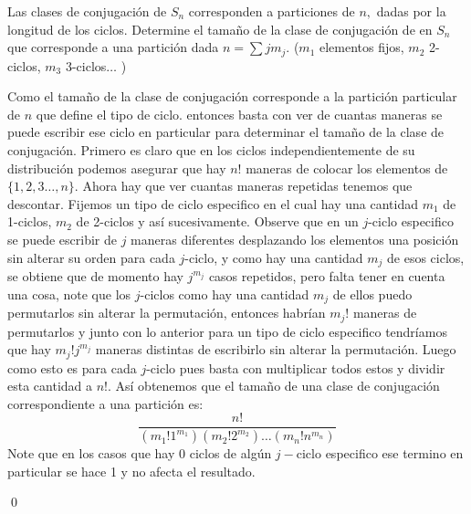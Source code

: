 
\usepackage{amsmath}
\usepackage{geometry}
\usepackage{tikz}
\usepackage{float}
\usepackage{graphics}



\maketitle
\thispagestyle{empty}
\newpage 

\begin{homeworkProblem}
    Las clases de conjugación de $S_n$ corresponden a particiones de $n,$ dadas por la longitud de los ciclos. Determine el tamaño de la clase de conjugación de en $S_n$ que corresponde a una partición dada $n=\sum jm_j.$ ($m_1$ elementos fijos, $m_2$ 2-ciclos, $m_3$ 3-ciclos$\dots$ )
    \begin{solucion}
     Como el tamaño de la clase de conjugación corresponde a la partición particular de $n$ que define el tipo de ciclo. entonces basta con ver de cuantas maneras se puede escribir ese ciclo en particular para determinar el tamaño de la clase de conjugación. Primero es claro que en los ciclos independientemente de su distribución podemos asegurar que hay $n!$ maneras de colocar los elementos de $\{1,2,3\dots,n\}$. Ahora hay que ver cuantas maneras repetidas tenemos que descontar. Fijemos un tipo de ciclo especifico en el cual hay una cantidad $m_1$ de 1-ciclos, $m_2$ de 2-ciclos y así sucesivamente. Observe que en un $j$-ciclo especifico se puede escribir de $j$ maneras diferentes desplazando los elementos una posición sin alterar su orden para cada $j$-ciclo, y como hay una cantidad $m_j$ de esos ciclos, se obtiene que de momento hay $j^{m_j}$ casos repetidos, pero falta tener en cuenta una cosa, note que los $j$-ciclos como hay una cantidad $m_j$ de ellos puedo permutarlos sin alterar la permutación, entonces habrían $m_j!$ maneras de permutarlos y junto con lo anterior para un tipo de ciclo especifico tendríamos que hay $m_j!j^{m_j}$ maneras distintas de escribirlo sin alterar la permutación. Luego como esto es para cada $j$-ciclo pues basta con multiplicar todos estos y dividir esta cantidad a $n!$. Así obtenemos que el tamaño de una clase de conjugación correspondiente a una partición es:
     $$\frac{n!}{(m_1!1^{m_1})(m_2!2^{m_2})\dots(m_n!n^{m_n})}$$
     Note que en los casos que hay 0 ciclos de algún $j-$ciclo especifico ese termino en particular se hace 1 y no afecta el resultado.

     \qed
     \end{solucion}
\end{homeworkProblem}
